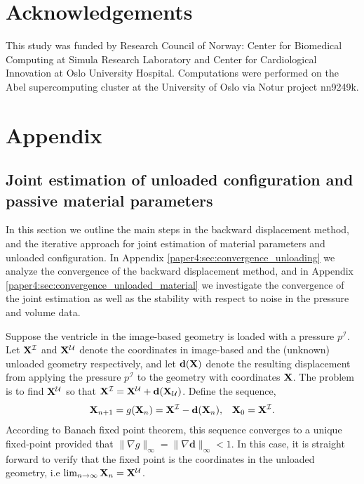 \section*{Acknowledgements}
This study was funded by Research Council of Norway: Center
for Biomedical Computing at Simula Research Laboratory and Center
for Cardiological Innovation at Oslo University Hospital.
Computations were performed on the Abel supercomputing cluster at
the University of Oslo via Notur project nn9249k. 


\clearpage

\section{Appendix}
\subsection{Joint estimation of unloaded
  configuration and passive material parameters}
\label{paper4:sec:unloading}
In this section we outline the main steps in the backward displacement
method, and the iterative approach for joint estimation of material
parameters and unloaded configuration. In Appendix
\ref{paper4:sec:convergence_unloading} we analyze the convergence of the
backward displacement method, and in Appendix
\ref{paper4:sec:convergence_unloaded_material} we investigate the convergence
of the joint estimation as well as the stability with respect to noise
in the pressure and volume data. 

Suppose the ventricle in the image-based geometry is loaded with
a pressure $p^{\mathcal{I}}$.  Let
$\mathbf{X}^{\mathcal{I}}$ and $\mathbf{X}^{\mathcal{U}}$ denote the coordinates
in image-based and the (unknown) unloaded geometry respectively, and
let $\mathbf{d}(\mathbf{X})$ denote the resulting displacement from applying the
pressure $p^{\mathcal{I}}$ to the geometry with coordinates
$\mathbf{X}$. The problem is to find $\mathbf{X}^{\mathcal{U}}$ so that
$\mathbf{X}^{\mathcal{I}} = \mathbf{X}^{\mathcal{U}} +
\mathbf{d}(\mathbf{X}_{\mathcal{U}})$. Define the sequence,   
\begin{align}
  \mathbf{X}_{n+1} = g(\mathbf{X}_n) =  \mathbf{X}^{\mathcal{I}} - \mathbf{d}(\mathbf{X}_n),
  && \mathbf{X}_0 = \mathbf{X}^{\mathcal{I}}.
    \label{paper4:eq:backward_displacement_method}
\end{align}
According to Banach fixed point theorem, this sequence converges to a
unique fixed-point provided that $\| \nabla g \|_{\infty} = \| \nabla \mathbf{d}
\|_{\infty} < 1$. In this case, it is straight forward to verify that
the fixed point is the coordinates in the unloaded geometry, i.e
$\lim_{n \rightarrow \infty} \mathbf{X}_n = \mathbf{X}^{\mathcal{U}}$.



